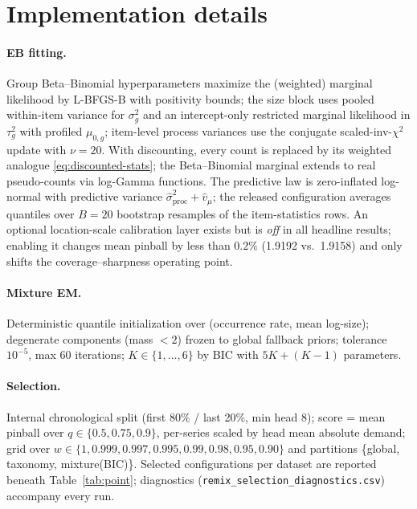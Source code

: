 \documentclass[twocolumn,10pt]{article}
\begin{document}
\section{Implementation details}\label{app:implementation}

\paragraph{EB fitting.} Group Beta--Binomial hyperparameters maximize the
(weighted) marginal likelihood by L-BFGS-B with positivity bounds; the
size block uses pooled within-item variance for $\sigma^2_g$ and an
intercept-only restricted marginal likelihood in $\tau^2_g$ with profiled
$\mu_{0,g}$; item-level process variances use the conjugate
scaled-inv-$\chi^2$ update with $\nu{=}20$. With discounting, every count
is replaced by its weighted analogue \eqref{eq:discounted-stats}; the
Beta--Binomial marginal extends to real pseudo-counts via log-Gamma
functions. The predictive law is zero-inflated log-normal with predictive
variance $\hat\sigma^2_{\mathrm{proc}}+\hat v_\mu$; the released
configuration averages quantiles over $B{=}20$ bootstrap resamples of the
item-statistics rows. An optional location-scale calibration layer exists
but is \emph{off} in all headline results; enabling it changes mean
pinball by less than $0.2\%$ (1.9192 vs.\ 1.9158) and only shifts the
coverage--sharpness operating point.

\paragraph{Mixture EM.} Deterministic quantile initialization over
(occurrence rate, mean log-size); degenerate components (mass $<2$)
frozen to global fallback priors; tolerance $10^{-5}$, max 60 iterations;
$K\in\{1,\dots,6\}$ by BIC with $5K+(K-1)$ parameters.

\paragraph{Selection.} Internal chronological split (first 80\% / last
20\%, min head 8); score = mean pinball over $q\in\{0.5,0.75,0.9\}$,
per-series scaled by head mean absolute demand; grid over
$w\in\{1,0.999,0.997,0.995,0.99,0.98,0.95,0.90\}$ and partitions
\{global, taxonomy, mixture(BIC)\}. Selected configurations per dataset
are reported beneath Table~\ref{tab:point}; diagnostics
(\texttt{remix\_selection\_diagnostics.csv}) accompany every run.
\end{document}
